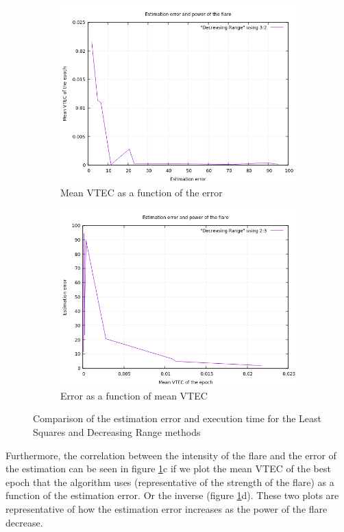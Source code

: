\begin{figure}[!htb]
\begin{subfigure}[b]{0.5\textwidth}
		\includegraphics[width=\linewidth]{images/results/errorVSmeanVTEC.png}
		\caption{Mean VTEC as a function of the error}
	\end{subfigure}
	\hfill
	\begin{subfigure}[b]{0.5\textwidth}
		\includegraphics[width=\linewidth]{images/results/meanVTECVSerror.png}
		\caption{Error as a function of mean VTEC}
	\end{subfigure}
	\caption{Comparison of the estimation error and execution time for the Least Squares and Decreasing Range methods}
	\label{fig:comparisonDRLS}
\end{figure}

Furthermore, the correlation between the intensity of the flare and the error of the estimation can be seen in figure \ref{fig:comparisonDRLS}c if we plot the mean VTEC of the best epoch that the algorithm uses (representative of the strength of the flare) as a function of the estimation error. Or the inverse (figure \ref{fig:comparisonDRLS}d). These two plots are representative of how the estimation error increases as the power of the flare decrease.

